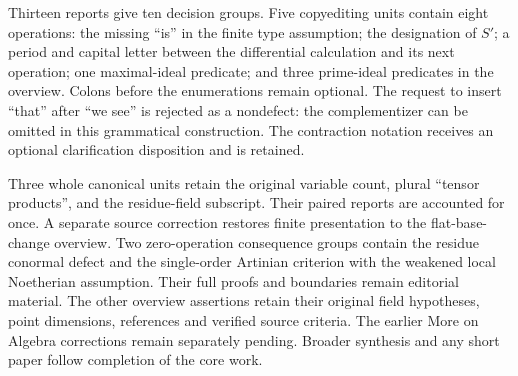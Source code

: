 Thirteen reports give ten decision groups. Five copyediting units contain eight operations: the missing ``is'' in the finite type assumption; the designation of \(S'\); a period and capital letter between the differential calculation and its next operation; one maximal-ideal predicate; and three prime-ideal predicates in the overview. Colons before the enumerations remain optional. The request to insert ``that'' after ``we see'' is rejected as a nondefect: the complementizer can be omitted in this grammatical construction. The contraction notation receives an optional clarification disposition and is retained.

Three whole canonical units retain the original variable count, plural ``tensor products'', and the residue-field subscript. Their paired reports are accounted for once. A separate source correction restores finite presentation to the flat-base-change overview. Two zero-operation consequence groups contain the residue conormal defect and the single-order Artinian criterion with the weakened local Noetherian assumption. Their full proofs and boundaries remain editorial material. The other overview assertions retain their original field hypotheses, point dimensions, references and verified source criteria. The earlier More on Algebra corrections remain separately pending. Broader synthesis and any short paper follow completion of the core work.
